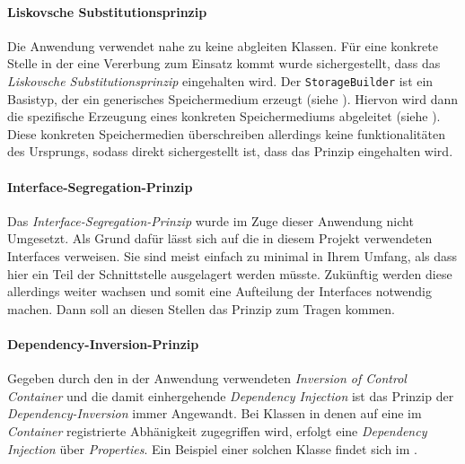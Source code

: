 \paragraph{Liskovsche Substitutionsprinzip}

Die Anwendung verwendet nahe zu keine abgleiten Klassen.
Für eine konkrete Stelle in der eine Vererbung zum Einsatz kommt wurde sichergestellt, dass das \emph{Liskovsche Substitutionsprinzip} eingehalten wird.
Der \texttt{StorageBuilder} ist ein Basistyp, der ein generisches Speichermedium erzeugt (siehe ).
Hiervon wird dann die spezifische Erzeugung eines konkreten Speichermediums abgeleitet (siehe ).
Diese konkreten Speichermedien überschreiben allerdings keine funktionalitäten des Ursprungs, sodass direkt sichergestellt ist, dass das Prinzip eingehalten wird.

\bgroup

    \label{lst:storage_builder}
\egroup

\bgroup

    \label{lst:volume_builder}
\egroup

\newpage

\paragraph{Interface-Segregation-Prinzip}

Das \emph{Interface-Segregation-Prinzip} wurde im Zuge dieser Anwendung nicht Umgesetzt.
Als Grund dafür lässt sich auf die in diesem Projekt verwendeten Interfaces verweisen.
Sie sind meist einfach zu minimal in Ihrem Umfang, als dass hier ein Teil der Schnittstelle ausgelagert werden müsste.
Zukünftig werden diese allerdings weiter wachsen und somit eine Aufteilung der Interfaces notwendig machen.
Dann soll an diesen Stellen das Prinzip zum Tragen kommen.

\paragraph{Dependency-Inversion-Prinzip}

Gegeben durch den in der Anwendung verwendeten \emph{Inversion of Control Container} und die damit einhergehende \emph{Dependency Injection} ist das Prinzip der \emph{Dependency-Inversion} immer Angewandt.
Bei Klassen in denen auf eine im \emph{Container} registrierte Abhänigkeit zugegriffen wird, erfolgt eine \emph{Dependency Injection} über \emph{Properties}.
Ein Beispiel einer solchen Klasse findet sich im .

\bgroup

    \label{lst:apply_command}
\egroup